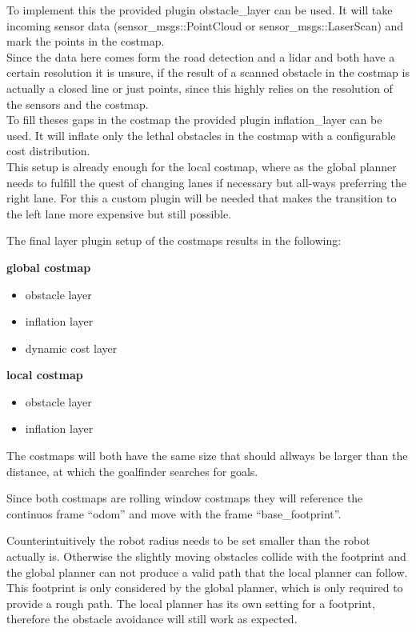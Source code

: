 To implement this the provided plugin obstacle\_layer can be used. It will take incoming sensor data (sensor\_msgs::PointCloud or sensor\_msgs::LaserScan) and mark the points in the costmap.\\

Since the data here comes form the road detection and a lidar and both have a certain resolution it is unsure, if the result of a scanned obstacle in the costmap is actually a closed line or just points, since this highly relies on the resolution of the sensors and the costmap.\\

To fill theses gaps in the costmap the provided plugin inflation\_layer can be used. It will inflate only the lethal obstacles in the costmap with a configurable cost distribution.\\

This setup is already enough for the local costmap, where as the global planner needs to fulfill the quest of changing lanes if necessary but all-ways preferring the right lane. For this a custom plugin will be needed that makes the transition to the left lane more expensive but still possible.


The final layer plugin setup of the costmaps results in the following:

\textbf{global costmap}
\begin{itemize}
	\item obstacle layer
	\item inflation layer
	\item dynamic cost layer
\end{itemize}

\textbf{local costmap}
\begin{itemize}
	\item obstacle layer
	\item inflation layer
\end{itemize}

The costmaps will both have the same size that should allways be larger than the distance, at which the goalfinder searches for goals.

Since both costmaps are rolling window costmaps they will reference the continuos frame ``odom'' and move with the frame ``base\_footprint''.

Counterintuitively the robot radius needs to be set smaller than the robot actually is. Otherwise the slightly moving obstacles collide with the footprint and the global planner can not produce a valid path that the local planner can follow.\\
This footprint is only considered by the global planner, which is only required to provide a rough path. The local planner has its own setting for a footprint, therefore the obstacle avoidance will still work as expected.

